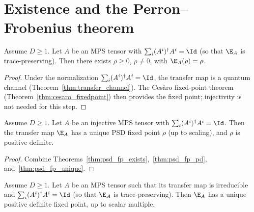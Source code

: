 \section{Existence and the Perron--Frobenius theorem}

\begin{theorem}\label{thm:psd_fp_exists}
    \leanok
    Assume $D \ge 1$. Let $A$ be an MPS tensor with
    $\sum_i (A^i)^\dagger A^i = \Id$ (so that $\E_A$ is
    trace-preserving).
    Then there exists $\rho \ge 0$, $\rho \neq 0$,
    with $\E_A(\rho) = \rho$.
\end{theorem}

\begin{proof}
    \leanok
    Under the normalization $\sum_i (A^i)^\dagger A^i = \Id$,
    the transfer map is a quantum channel
    (Theorem~\ref{thm:transfer_channel}).
    The Ces\`aro fixed-point theorem
    (Theorem~\ref{thm:cesaro_fixedpoint}) then provides the
    fixed point; injectivity is not needed for this step.
\end{proof}

\begin{theorem}\label{thm:qpf}
    \leanok
    Assume $D \ge 1$. Let $A$ be an injective MPS tensor with
    $\sum_i (A^i)^\dagger A^i = \Id$.
    Then the transfer map $\E_A$ has a unique PSD fixed point
    $\rho$ (up to scaling), and $\rho$ is positive definite.
\end{theorem}

\begin{proof}
    \leanok
    Combine Theorems~\ref{thm:psd_fp_exists},~\ref{thm:psd_fp_pd},
    and~\ref{thm:psd_fp_unique}.
\end{proof}

\begin{theorem}
    \label{thm:qpf_irreducible}
    \leanok
    Assume $D\ge 1$. Let $A$ be an MPS tensor such that its transfer map is
    irreducible and $\sum_i (A^i)^\dagger A^i=\Id$ (so that $\E_A$ is
    trace-preserving).
    Then $\E_A$ has a unique positive definite fixed point, up to scalar
    multiple.
\end{theorem}

